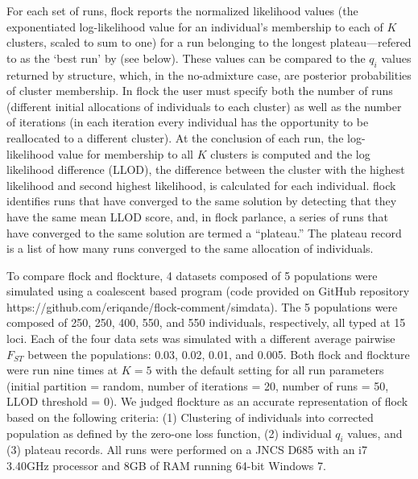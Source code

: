 For each set of runs, {\sc flock} reports the 
normalized likelihood values (the exponentiated log-likelihood value for an individual's 
membership to each of $K$ clusters, scaled to sum to one) for a run belonging to the 
longest plateau---refered to as the `best run' by \citep{Duc&Tur2012} (see below).
These values can be compared to the $q_i$ values
returned by {\sc structure}, which, in the no-admixture case, are posterior 
probabilities of cluster membership. In {\sc flock} the user must specify both the number of runs 
(different initial allocations of individuals 
to each cluster) as well as the number of iterations (in each iteration every individual 
has the opportunity to be reallocated 
to a different cluster).  At the conclusion of each run, the log-likelihood value for 
membership to all $K$ clusters is computed
and the log likelihood difference (LLOD), the difference between the 
cluster with the highest likelihood 
and second highest likelihood, is calculated for each individual. {\sc flock} 
identifies runs that have converged to the same solution by detecting 
that they have the same mean LLOD score, and, in 
{\sc flock} parlance, a series of runs that have converged to the same 
solution are termed a ``plateau.'' The plateau record is a list of 
how many runs converged to the same allocation
of individuals.


To compare {\sc flock} and {\sc flockture}, 4 datasets composed of 5 populations
were simulated using a coalescent based program (code provided on GitHub repository 
https://github.com/eriqande/flock-comment/simdata). The 5 populations
were composed of 250, 250, 400, 550, and 550 individuals, respectively, all typed  at 15 loci.
Each of the four data sets was simulated with a different 
average pairwise $F_{ST}$ between the populations: 0.03, 0.02, 0.01, and 0.005. 
Both {\sc flock} and {\sc flockture} were run nine times at $K=5$ with the default setting for all 
run parameters (initial partition = random, number of iterations = 20, number of runs = 50, 
LLOD threshold = 0). We judged {\sc flockture} as an accurate 
representation of {\sc flock} based on the
following criteria: (1) Clustering of individuals into corrected population as
 defined by the zero-one loss function, (2) individual $q_i$ values, and (3) plateau records. 
All runs were performed on a JNCS D685 with an i7 3.40GHz processor and 8GB of 
RAM running 64-bit Windows 7. 

